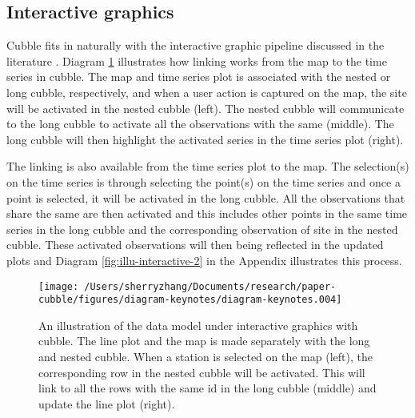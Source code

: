 \documentclass[
]{jss}
\begin{document}
\hypertarget{interactive-graphics}{%
\subsection{Interactive graphics}\label{interactive-graphics}}

Cubble fits in naturally with the interactive graphic pipeline discussed in the literature \citep{buja1988elements, buja1996interactive, sutherland2000orca, xie2014reactive, cheng2016enabling}. Diagram \ref{fig:illu-interactive} illustrates how linking works from the map to the time series in cubble. The map and time series plot is associated with the nested or long cubble, respectively, and when a user action is captured on the map, the site will be activated in the nested cubble (left). The nested cubble will communicate to the long cubble to activate all the observations with the same  (middle). The long cubble will then highlight the activated series in the time series plot (right).

The linking is also available from the time series plot to the map. The selection(s) on the time series is through selecting the point(s) on the time series and once a point is selected, it will be activated in the long cubble. All the observations that share the same  are then activated and this includes other points in the same time series in the long cubble and the corresponding observation of site in the nested cubble. These activated observations will then being reflected in the updated plots and Diagram \ref{fig:illu-interactive-2} in the Appendix illustrates this process.

\begin{CodeChunk}
\begin{figure}

{\centering \texttt{[image: /Users/sherryzhang/Documents/research/paper-cubble/figures/diagram-keynotes/diagram-keynotes.004]} 

}

\caption[An illustration of the data model under interactive graphics with cubble]{An illustration of the data model under interactive graphics with cubble. The line plot and the map is made separately with the long and nested cubble. When a station is selected on the map (left), the corresponding row in the nested cubble will be activated. This will link to all the rows with the same id in the long cubble (middle) and update the line plot (right).}\label{fig:illu-interactive}
\end{figure}
\end{CodeChunk}
\end{document}
